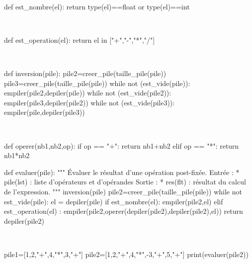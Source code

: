 \begin{corrige}

\question\
\begin{python}
def est_nombre(el):
    return type(el)==float or type(el)==int
\end{python}

\question\
\begin{python}
def est_operation(el):
    return el in ["+","-","*","/"]
\end{python}

\question\
\begin{python}
def inversion(pile):
    pile2=creer_pile(taille_pile(pile))
    pile3=creer_pile(taille_pile(pile))
    while not (est_vide(pile)):
        empiler(pile2,depiler(pile))
    while not (est_vide(pile2)):
        empiler(pile3,depiler(pile2))
    while not (est_vide(pile3)):
        empiler(pile,depiler(pile3))
\end{python}

\question\
\begin{python}
def operer(nb1,nb2,op):
    if op == "+":
        return nb1+nb2
    elif op == "*":
        return nb1*nb2
        
def evaluer(pile):
    """
    Évaluer le résultat d'une opération post-fixée.
    Entrée : 
     * pile(lst) : liste d'opérateurs et d'opérandes
    Sortie : 
     * res(flt) : résultat du calcul de l'expression.
    """
    inversion(pile)
    pile2=creer_pile(taille_pile(pile))
    while not est_vide(pile):
        el = depiler(pile)
        if est_nombre(el):
            empiler(pile2,el)
        elif est_operation(el) :
            empiler(pile2,operer(depiler(pile2),depiler(pile2),el))
    return depiler(pile2)

\end{python}

\question\
\begin{python}
pile1=[1,2,"+",4,"*",3,"+"]
pile2=[1,2,"+",4,"*",-3,"+",5,"+"]
print(evaluer(pile2))
\end{python}

\setcounter{question}{0}
\end{corrige}
\else\fi


